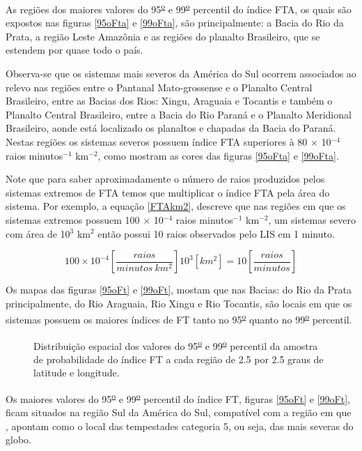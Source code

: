 As regiões dos maiores valores do 95\textsuperscript{\underline{o}} e 99\textsuperscript{\underline{o}} percentil do índice FTA, os quais são  expostos nas figuras \ref{95oFta} e \ref{99oFta}, são principalmente: a Bacia do Rio da Prata, a região Leste Amazônia e as regiões  do planalto Brasileiro, que se estendem por quase todo o país.

Observa-se que os sistemas mais severos da América do Sul ocorrem associados ao relevo nas regiões entre o Pantanal Mato-grossense e o Planalto Central Brasileiro, entre as Bacias dos Rios: Xingu, Araguaia e Tocantis e também o Planalto Central Brasileiro, entre a Bacia do Rio Paraná e o Planalto Meridional Brasileiro, aonde está localizado os planaltos e chapadas da Bacia do Paraná. Nestas regiões os sistemas severos possuem índice FTA superiores à 80 $\times$ 10$^{-4}$ raios minutos$^{-1}$ km$^{-2}$, como mostram as cores das figuras \ref{95oFta} e \ref{99oFta}. 

Note que para saber aproximadamente o número de raios produzidos pelos sistemas extremos de FTA temos que multiplicar o índice FTA pela área do sistema. Por exemplo, a equação \ref{FTAkm2}, descreve que nas regiões em que os sistemas extremos possuem 100 $\times$ 10$^{-4}$ raios minutos$^{-1}$ km$^{-2}$, um sistemas severo com área de 10$^3$ km$^2$ então possui 10 raios observados pelo LIS em 1 minuto.  

\begin{equation}
100 \times 10^{-4} \left[ \frac{raios}{minutos ~ km^2} \right]  10^3 [ km^2 ] = 10 \left[ \frac{raios}{minutos } \right]  
\label{FTAkm2}
\end{equation}

Os mapas das figuras \ref{95oFt} e \ref{99oFt}, mostam que nas Bacias: do Rio da Prata principalmente, do Rio Araguaia, Rio Xingu e Rio Tocantis, são locais em que os sistemas possuem os maiores índices de FT tanto no 95\textsuperscript{\underline{o}} quanto no 99\textsuperscript{\underline{o}} percentil.


\begin{figure}[!ht]
  \caption{Distribuição espacial dos valores do 95\textsuperscript{\underline{o}} e 99\textsuperscript{\underline{o}} percentil da amostra de probabilidade do índice FT a cada região de 2.5 por 2.5 graus de latitude e longitude.}
\label{extremosSupFT}
\end{figure} 


Os maiores valores do 95\textsuperscript{\underline{o}} e 99\textsuperscript{\underline{o}} percentil do índice FT, figuras \ref{95oFt} e \ref{99oFt},  ficam situados na região Sul da América do Sul, compatível com a região em que , apontam como o local das tempestades categoria 5, ou seja, das mais severas do globo.


